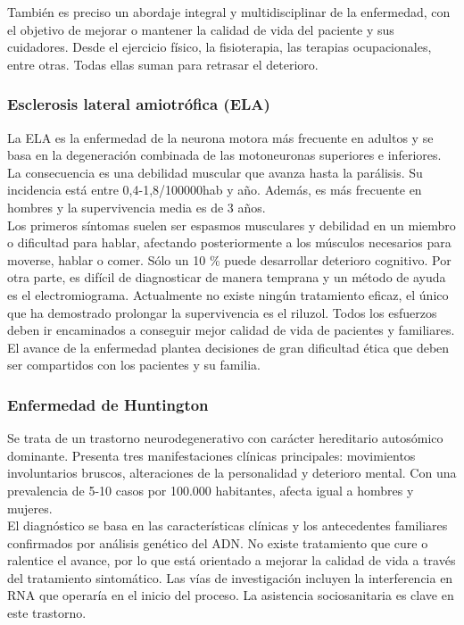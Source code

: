 También es preciso un abordaje integral y multidisciplinar de la enfermedad, con el objetivo de mejorar o mantener la calidad de vida del paciente y sus cuidadores. Desde el ejercicio físico, la fisioterapia, las terapias ocupacionales, entre otras. Todas ellas suman para retrasar el deterioro.		

\subsubsection{Esclerosis lateral amiotrófica (ELA)}

La ELA es la enfermedad de la neurona motora más frecuente en adultos y se basa en la degeneración combinada de las motoneuronas superiores e inferiores. La consecuencia es una debilidad muscular que avanza hasta la parálisis. Su incidencia está entre 0,4-1,8/100000hab y año. Además, es más frecuente en hombres y la supervivencia media es de 3 años.\\

Los primeros síntomas suelen ser espasmos musculares y debilidad en un miembro o dificultad para hablar, afectando posteriormente a los músculos necesarios para moverse, hablar o comer. Sólo un 10 \% puede desarrollar deterioro cognitivo. Por otra parte, es difícil de diagnosticar de manera temprana y un método de ayuda es el electromiograma. Actualmente no existe ningún tratamiento eficaz, el único que ha demostrado prolongar la supervivencia es el riluzol. Todos los esfuerzos deben ir encaminados a conseguir mejor calidad de vida de pacientes y familiares. El avance de la enfermedad plantea decisiones de gran dificultad ética que deben ser compartidos con los pacientes y su familia.


\subsubsection{Enfermedad de Huntington}
Se trata de un trastorno neurodegenerativo con carácter hereditario autosómico dominante. Presenta tres manifestaciones clínicas principales: movimientos involuntarios bruscos, alteraciones de la personalidad y deterioro mental. Con una prevalencia de 5-10 casos por 100.000 habitantes, afecta igual a hombres y mujeres.\\

El diagnóstico se basa en las características clínicas y los antecedentes familiares confirmados por análisis genético del ADN. No existe tratamiento que cure o ralentice el avance, por lo que está orientado a mejorar la calidad de vida a través del tratamiento sintomático. Las vías de investigación incluyen la interferencia en RNA que operaría en el inicio del proceso. La asistencia sociosanitaria es clave en este trastorno.

